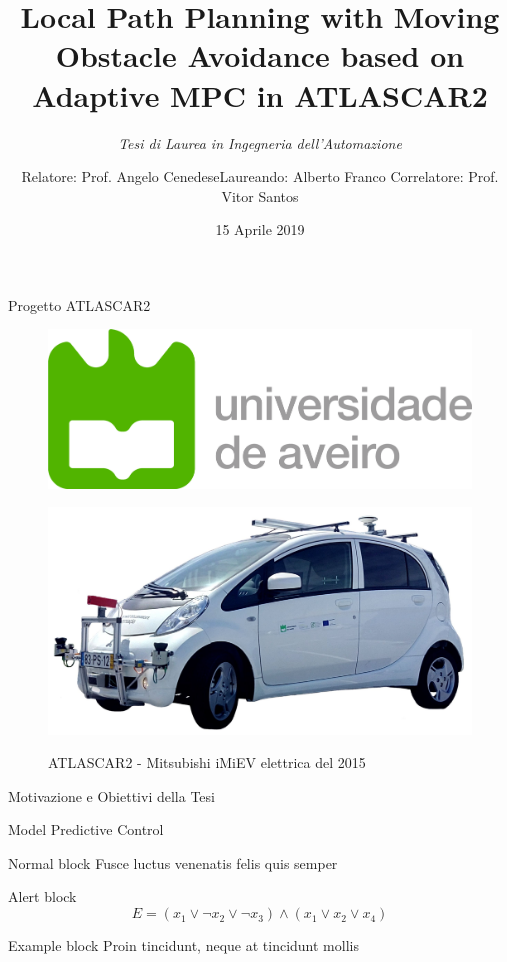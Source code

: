 \documentclass{beamer}
\title{Local Path Planning with Moving Obstacle Avoidance based on Adaptive MPC in ATLASCAR2}
\subtitle{\itshape Tesi di Laurea in Ingegneria dell'Automazione}
\author{Relatore: Prof. Angelo Cenedese\qquad\quad Laureando: Alberto Franco Correlatore: Prof. Vitor Santos}
\date{\vspace{0.4cm}15 Aprile 2019}
\begin{document}
	\maketitle

	\begin{frame}{Progetto ATLASCAR2}
	  
	  \begin{figure}[!t]
	  	\centering
	  	\begin{minipage}[t]{0.49\textwidth}
		  	\includegraphics[scale=0.32]{./images/logo_ua.png}
	  		\label{fig:logoua}
	  	\end{minipage}
	  	\begin{minipage}[t]{0.49\textwidth}
	  		\includegraphics[scale=0.055]{./images/atlascar2.pdf}
	  		\label{fig:atlascar2}
	  	\end{minipage}
	  	\caption{ATLASCAR2 - Mitsubishi iMiEV elettrica del 2015}
	  	\end{figure}

	\end{frame}

	\begin{frame}{Motivazione e Obiettivi della Tesi}
		
	\end{frame}


	\begin{frame}{Model Predictive Control}
		\begin{block}{Normal block}
			Fusce luctus venenatis felis quis semper
		\end{block}

		\begin{alertblock}{Alert block}
			$$ E = (x_1 \vee \neg x_2 \vee \neg x_3) \wedge (x_1 \vee x_2 \vee x_4) $$
		\end{alertblock}

		\begin{exampleblock}{Example block}
			Proin tincidunt, neque at tincidunt mollis
		\end{exampleblock}
	\end{frame}
	
\end{document}
